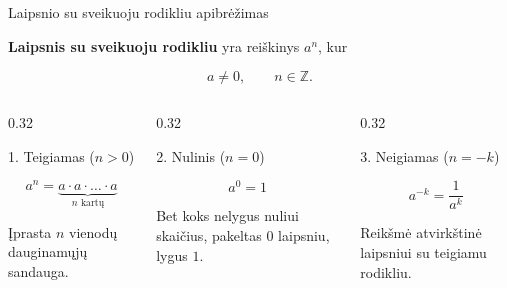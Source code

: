 \documentclass[aspectratio=169,10pt]{beamer}
\newcommand{\vocab}[1]{\textbf{\color{structure.fg}#1}}
\begin{document}

\begin{frame}{Laipsnio su sveikuoju rodikliu apibrėžimas}

    \begin{definition}

        \vocab{Laipsnis su sveikuoju rodikliu}
        yra reiškinys $a^n$, kur

        \[
        a\neq0,
        \qquad
        n\in\mathbb{Z}.
        \]

    \end{definition}

    \vspace{0.2cm}

    \begin{columns}[T]

        \begin{column}{0.32\textwidth}

            \begin{block}{1. Teigiamas ($n>0$)}

                \[
                a^n
                =
                \underbrace{
                a\cdot a\cdot\dots\cdot a
                }_{n\text{ kartų}}
                \]

                Įprasta $n$ vienodų dauginamųjų sandauga.

            \end{block}

        \end{column}

        \begin{column}{0.32\textwidth}

            \begin{block}{2. Nulinis ($n=0$)}

                \[
                a^0=1
                \]

                Bet koks nelygus nuliui skaičius,
                pakeltas $0$ laipsniu, lygus $1$.

            \end{block}

        \end{column}

        \begin{column}{0.32\textwidth}

            \begin{block}{3. Neigiamas ($n=-k$)}

                \[
                a^{-k}=\frac{1}{a^k}
                \]

                Reikšmė atvirkštinė laipsniui
                su teigiamu rodikliu.

            \end{block}

        \end{column}

    \end{columns}

\end{frame}
\end{document}
